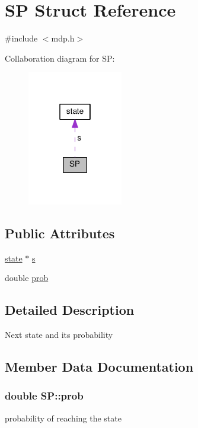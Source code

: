 \hypertarget{structSP}{}\section{SP Struct Reference}
\label{structSP}


{\ttfamily \#include $<$mdp.\+h$>$}



Collaboration diagram for SP\+:\nopagebreak
\begin{figure}[H]
\begin{center}
\leavevmode
\includegraphics[width=118pt]{structSP__coll__graph}
\end{center}
\end{figure}
\subsection*{Public Attributes}
\begin{DoxyCompactItemize}
\item 
\hyperlink{structstate}{state} $\ast$ \hyperlink{structSP_a8bf41ff3d3a30c4f6f078507c176f85f}{s}
\item 
double \hyperlink{structSP_a0c560f674a6adbae23d600147c999aa5}{prob}
\end{DoxyCompactItemize}


\subsection{Detailed Description}
Next state and its probability 

\subsection{Member Data Documentation}
\subsubsection[{\texorpdfstring{prob}{prob}}]{\setlength{\rightskip}{0pt plus 5cm}double S\+P\+::prob}\hypertarget{structSP_a0c560f674a6adbae23d600147c999aa5}{}\label{structSP_a0c560f674a6adbae23d600147c999aa5}
probability of reaching the state 
